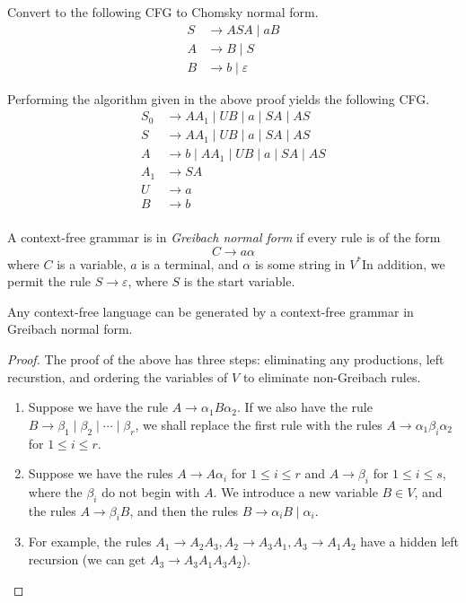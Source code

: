 \begin{exercise}
Convert to the following CFG to Chomsky normal form.
\begin{align*}
    S&\to ASA\mid aB \\
    A&\to B\mid S \\
    B&\to b\mid\varepsilon
\end{align*}
\end{exercise}
\begin{solution}
Performing the algorithm given in the above proof yields the following CFG.
\begin{align*}
    S_0&\to AA_1\mid UB\mid a\mid SA\mid AS \\
    S&\to AA_1\mid UB\mid a\mid SA\mid AS \\
    A&\to b\mid AA_1\mid UB\mid a\mid SA\mid AS \\
    A_1&\to SA \\
    U&\to a \\
    B&\to b \\
\end{align*}
\end{solution}

\begin{definition}
    A context-free grammar is in \textit{Greibach normal form} if every rule is of the form
    \[ C \to a\alpha \]
    where $C$ is a variable, $a$ is a terminal, and $\alpha$ is some string in $V^*$In addition, we permit the rule $S\to\varepsilon$, where $S$ is the start variable.
\end{definition}

\begin{theorem}
    Any context-free language can be generated by a context-free grammar in Greibach normal form.
\end{theorem}
\begin{proof}
    The proof of the above has three steps: eliminating any productions, left recurstion, and ordering the variables of $V$ to eliminate non-Greibach rules.
    \begin{enumerate}
        \item Suppose we have the rule $A \to \alpha_1 B \alpha_2$. If we also have the rule $B \to \beta_1 \mid \beta_2 \mid \cdots \mid \beta_r$, we shall replace the first rule with the rules $A \to \alpha_1 \beta_i \alpha_2$ for $1 \le i \le r$.

        \item Suppose we have the rules $A \to A\alpha_i$ for $1 \le i \le r$ and $A \to \beta_i$ for $1 \le i \le s$, where the $\beta_i$ do not begin with $A$. We introduce a new variable $B \in V$, and the rules $A \to \beta_i B$, and then the rules $B \to \alpha_i B \mid \alpha_i$.

        \item For example, the rules $A_1 \to A_2 A_3, A_2 \to A_3 A_1, A_3 \to A_1 A_2$ have a hidden left recursion (we can get $A_3 \to A_3 A_1 A_3 A_2$). 
    \end{enumerate}
\end{proof}

